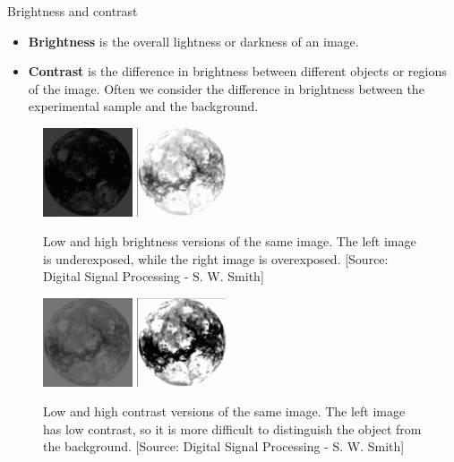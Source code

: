 \documentclass[9pt, aspectratio=169]{beamer}
\begin{document}
\begin{frame}
	{Brightness and contrast}
	\begin{itemize}
		\item \textbf{Brightness} is the overall lightness or darkness of an image.
		\item \textbf{Contrast} is the difference in brightness between different objects or regions of the image. Often we consider the difference in brightness between the experimental sample and the background.
	\end{itemize}
	{
		\begin{figure}
			\centering
			\includegraphics[width=100px]{lowbright.png}
			\includegraphics[width=100px]{highbright.png}
			\caption{
				\centering
				Low and high brightness versions of the same image. The left image is underexposed, while the right image is overexposed. [Source: Digital Signal Processing - S. W. Smith]
			}
		\end{figure}
	}
	{
		\begin{figure}
			\centering
			\includegraphics[width=100px]{lowcont.png}
			\includegraphics[width=100px]{highcont.png}
			\caption{
				\centering
				Low and high contrast versions of the same image. The left image has low contrast, so it is more difficult to distinguish the object from the background. [Source: Digital Signal Processing - S. W. Smith]
			}
		\end{figure}
	}
\end{frame}
\end{document}
